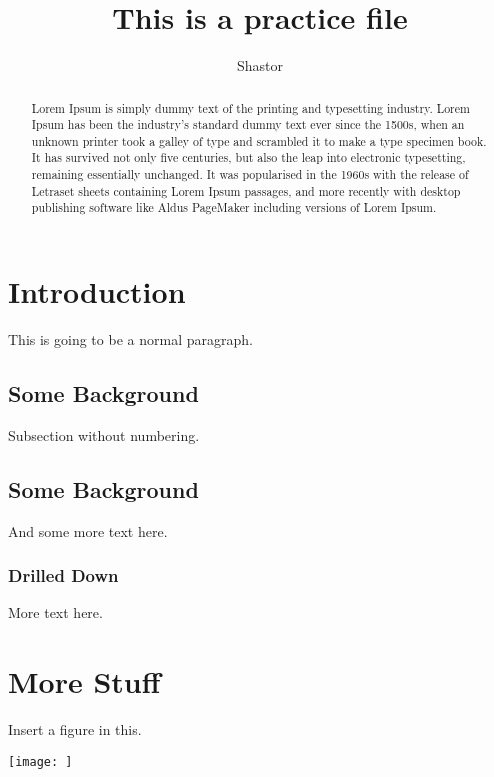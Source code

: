 \documentclass{article}
\title{This is a practice file}
\author{Shastor}
\begin{document}
    \maketitle
    
    \begin{abstract}
    
    Lorem Ipsum is simply dummy text of the printing and typesetting industry. Lorem Ipsum has been the industry's standard dummy text ever since the 1500s, when an unknown printer took a galley of type and scrambled it to make a type specimen book. It has survived not only five centuries, but also the leap into electronic typesetting, remaining essentially unchanged. It was popularised in the 1960s with the release of Letraset sheets containing Lorem Ipsum passages, and more recently with desktop publishing software like Aldus PageMaker including versions of Lorem Ipsum.
    
    \end{abstract}
    
    \section{Introduction}
    This is going to be a  normal paragraph.

    \subsection*{Some Background}
    Subsection without numbering.

    \subsection{Some Background}
    And some more text here.

    \subsubsection{Drilled Down}\label{sec:drilled-down}
    More text here.

    \section{More Stuff}

    Insert a figure in this.

    \texttt{[image: ]}


    
\end{document}
